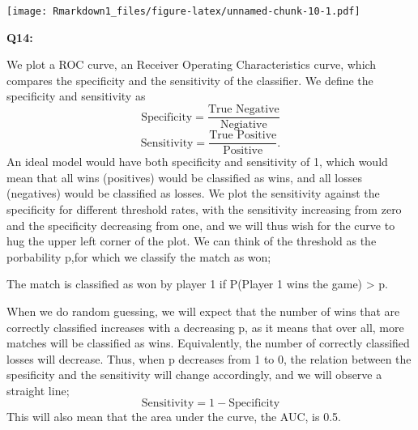 \documentclass[]{article}
\newenvironment{Shaded}{\begin{snugshade}}{\end{snugshade}}
\newcommand{\KeywordTok}[1]{\textcolor[rgb]{0.13,0.29,0.53}{\textbf{#1}}}
\newcommand{\DataTypeTok}[1]{\textcolor[rgb]{0.13,0.29,0.53}{#1}}
\newcommand{\DecValTok}[1]{\textcolor[rgb]{0.00,0.00,0.81}{#1}}
\newcommand{\StringTok}[1]{\textcolor[rgb]{0.31,0.60,0.02}{#1}}
\newcommand{\CommentTok}[1]{\textcolor[rgb]{0.56,0.35,0.01}{\textit{#1}}}
\newcommand{\OtherTok}[1]{\textcolor[rgb]{0.56,0.35,0.01}{#1}}
\newcommand{\OperatorTok}[1]{\textcolor[rgb]{0.81,0.36,0.00}{\textbf{#1}}}
\newcommand{\NormalTok}[1]{#1}
\begin{document}
\texttt{[image: Rmarkdown1\_files/figure-latex/unnamed-chunk-10-1.pdf]}

\textbf{Q14:}

We plot a ROC curve, an Receiver Operating Characteristics curve, which
compares the specificity and the sensitivity of the classifier. We
define the specificity and sensitivity as
\[\text{Specificity} = \frac{\text{True Negative}}{\text{Negiative}}\]
\[\text{Sensitivity} = \frac{\text{True Positive}}{\text{Positive}}.\]
An ideal model would have both specificity and sensitivity of 1, which
would mean that all wins (positives) would be classified as wins, and
all losses (negatives) would be classified as losses. We plot the
sensitivity against the specificity for different threshold rates, with
the sensitivity increasing from zero and the specificity decreasing from
one, and we will thus wish for the curve to hug the upper left corner of
the plot. We can think of the threshold as the porbability p,for which
we classify the match as won;

The match is classified as won by player 1 if P(Player 1 wins the game)
\textgreater{} p.

When we do random guessing, we will expect that the number of wins that
are correctly classified increases with a decreasing p, as it means that
over all, more matches will be classified as wins. Equivalently, the
number of correctly classified losses will decrease. Thus, when p
decreases from 1 to 0, the relation between the spesificity and the
sensitivity will change accordingly, and we will observe a straight
line; \[\text{Sensitivity} = 1 - \text{Specificity}\] This will also
mean that the area under the curve, the AUC, is 0.5.

\begin{Shaded}
\end{Shaded}
\end{document}
